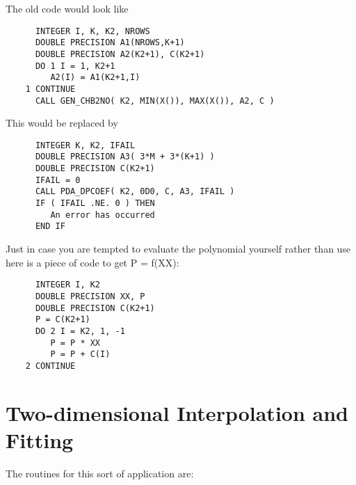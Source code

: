    The old code would look like

\begin{verbatim}
      INTEGER I, K, K2, NROWS
      DOUBLE PRECISION A1(NROWS,K+1)
      DOUBLE PRECISION A2(K2+1), C(K2+1)
      DO 1 I = 1, K2+1
         A2(I) = A1(K2+1,I)
    1 CONTINUE
      CALL GEN_CHB2NO( K2, MIN(X()), MAX(X()), A2, C )
\end{verbatim}

   This would be replaced by

\begin{verbatim}
      INTEGER K, K2, IFAIL
      DOUBLE PRECISION A3( 3*M + 3*(K+1) )
      DOUBLE PRECISION C(K2+1)
      IFAIL = 0
      CALL PDA_DPCOEF( K2, 0D0, C, A3, IFAIL )
      IF ( IFAIL .NE. 0 ) THEN
         An error has occurred
      END IF
\end{verbatim}

   Just in case you are tempted to evaluate the polynomial yourself
   rather than use
   here is a piece of code to get P = f(XX):

\begin{verbatim}
      INTEGER I, K2
      DOUBLE PRECISION XX, P
      DOUBLE PRECISION C(K2+1)
      P = C(K2+1)
      DO 2 I = K2, 1, -1
         P = P * XX
         P = P + C(I)
    2 CONTINUE
\end{verbatim}

\section{Two-dimensional
Interpolation and Fitting}

The routines for this sort of application are:

